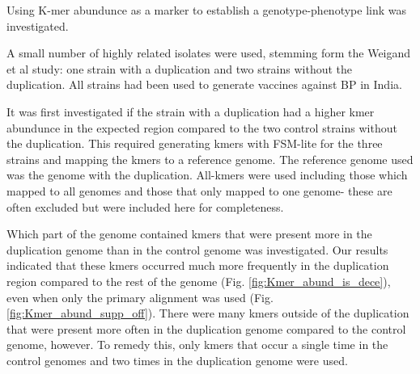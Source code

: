 \documentclass{article}
\begin{document}
Using K-mer abundunce as a marker to establish a genotype-phenotype link was investigated.

A small number of highly related isolates were used, stemming form the Weigand et al study: one strain with a duplication and two strains without the duplication. All strains had been used to generate vaccines against BP in India.

It was first investigated if the strain with a duplication had a higher kmer abundunce in the expected region compared to the two control strains without the duplication. This required generating kmers with FSM-lite for the three strains and mapping the kmers to a reference genome. The reference genome used was the genome with the duplication. All-kmers were used including those which mapped to all genomes and those that only mapped to one genome- these are often excluded but were included here for completeness.

Which part of the genome contained kmers that were present more in the duplication genome than in the control genome was investigated. Our results indicated that these kmers occurred much more frequently in the duplication region compared to the rest of the genome (Fig. \ref{fig:Kmer_abund_is_dece}), even when only the primary alignment was used (Fig. \ref{fig:Kmer_abund_supp_off}). There were many kmers outside of the duplication that were present more often in the duplication genome compared to the control genome, however. To remedy this, only kmers that occur a single time in the control genomes and two times in the duplication genome were used.
\end{document}

